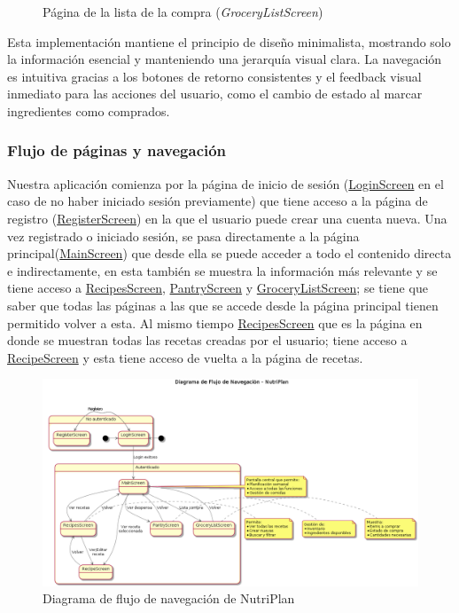 \documentclass[twoside, openright, 11pt]{report}
\begin{document}
\begin{figure}[H]
					\caption{Página de la lista de la compra (\textit{GroceryListScreen})}
					\label{fig:GroceryListScreen}
				\end{figure}
				
				Esta implementación mantiene el principio de diseño minimalista, mostrando solo la información esencial y manteniendo una jerarquía visual clara. La navegación es intuitiva gracias a los botones de retorno consistentes y el feedback visual inmediato para las acciones del usuario, como el cambio de estado al marcar ingredientes como comprados.
				
				\subsubsection{Flujo de páginas y navegación}
				
				Nuestra aplicación comienza por la página de inicio de sesión (\hyperref[LoginScreen]{LoginScreen} en el caso de no haber iniciado sesión previamente) que tiene acceso a la página de registro (\hyperref[RegisterScreen]{RegisterScreen}) en la que el usuario puede crear una cuenta nueva. Una vez registrado o iniciado sesión, se pasa directamente a la página principal(\hyperref[MainScreen]{MainScreen}) que desde ella se puede acceder a todo el contenido directa e indirectamente, en esta también se muestra la información más relevante y se tiene acceso a \hyperref[RecipesScreen]{RecipesScreen}, \hyperref[PantryScreen]{PantryScreen} y \hyperref[GroceryListScreen]{GroceryListScreen}; se tiene que saber que todas las páginas a las que se accede desde la página principal tienen permitido volver a esta.
				Al mismo tiempo \hyperref[RecipesScreen]{RecipesScreen} que es la página en donde se muestran todas las recetas creadas por el usuario; tiene acceso a \hyperref[RecipeScreen]{RecipeScreen} y esta tiene acceso de vuelta a la página de recetas.
				
				\begin{figure}[H]
					\centering
					\includegraphics[width=\textwidth]{imagenes/navigation_flow}
					\caption{Diagrama de flujo de navegación de NutriPlan}
					\label{fig:navigation_flow}
				\end{figure}
				
\end{document}
